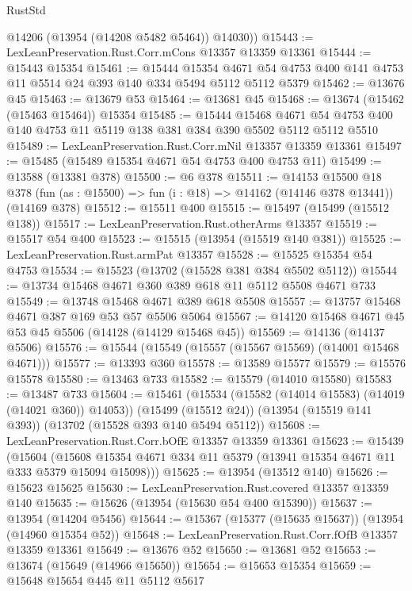 \begin{lexlean}{RustStd}
\begin{coremodule}
        @14206
        (@13954 (@14208 @5482 @5464))
        @14030))
@15443 := LexLeanPreservation.Rust.Corr.mCons @13357 @13359 @13361
@15444 := @15443 @15354
@15461 := @15444
    @15354
    @4671
    @54
    @4753
    @400
    @141
    @4753
    @11
    @5514
    @24
    @393
    @140
    @334
    @5494
    @5112
    @5112
    @5379
@15462 := @13676 @45
@15463 := @13679 @53
@15464 := @13681 @45
@15468 := @13674 (@15462 (@15463 @15464)) @15354
@15485 := @15444
    @15468
    @4671
    @54
    @4753
    @400
    @140
    @4753
    @11
    @5119
    @138
    @381
    @384
    @390
    @5502
    @5112
    @5112
    @5510
@15489 := LexLeanPreservation.Rust.Corr.mNil @13357 @13359 @13361
@15497 := @15485 (@15489 @15354 @4671 @54 @4753 @400 @4753 @11)
@15499 := @13588 (@13381 @378)
@15500 := @6 @378
@15511 := @14153
    @15500
    @18
    @378
    (fun (as : @15500) => fun (i : @18) => @14162 (@14146 @378 @13441))
    (@14169 @378)
@15512 := @15511 @400
@15515 := @15497 (@15499 (@15512 @138))
@15517 := LexLeanPreservation.Rust.otherArms @13357
@15519 := @15517 @54 @400
@15523 := @15515 (@13954 (@15519 @140 @381))
@15525 := LexLeanPreservation.Rust.armPat @13357
@15528 := @15525 @15354 @54 @4753
@15534 := @15523 (@13702 (@15528 @381 @384 @5502 @5112))
@15544 := @13734 @15468 @4671 @360 @389 @618 @11 @5112 @5508 @4671 @733
@15549 := @13748 @15468 @4671 @389 @618 @5508
@15557 := @13757 @15468 @4671 @387 @169 @53 @57 @5506 @5064
@15567 := @14120 @15468 @4671 @45 @53 @45 @5506 (@14128 (@14129 @15468 @45))
@15569 := @14136 (@14137 @5506)
@15576 := @15544 (@15549 (@15557 (@15567 @15569) (@14001 @15468 @4671)))
@15577 := @13393 @360
@15578 := @13589 @15577
@15579 := @15576 @15578
@15580 := @13463 @733
@15582 := @15579 (@14010 @15580)
@15583 := @13487 @733
@15604 := @15461
    (@15534 (@15582 (@14014 @15583) (@14019 (@14021 @360)) @14053))
    (@15499 (@15512 @24))
    (@13954 (@15519 @141 @393))
    (@13702 (@15528 @393 @140 @5494 @5112))
@15608 := LexLeanPreservation.Rust.Corr.bOfE @13357 @13359 @13361
@15623 := @15439
    (@15604 (@15608 @15354 @4671 @334 @11 @5379 (@13941 @15354 @4671 @11 @333 @5379 @15094 @15098)))
@15625 := @13954 (@13512 @140)
@15626 := @15623 @15625
@15630 := LexLeanPreservation.Rust.covered @13357 @13359 @140
@15635 := @15626 (@13954 (@15630 @54 @400 @15390))
@15637 := @13954 (@14204 @5456)
@15644 := @15367 (@15377 (@15635 @15637)) (@13954 (@14960 @15354 @52))
@15648 := LexLeanPreservation.Rust.Corr.fOfB @13357 @13359 @13361
@15649 := @13676 @52
@15650 := @13681 @52
@15653 := @13674 (@15649 (@14966 @15650))
@15654 := @15653 @15354
@15659 := @15648 @15654 @445 @11 @5112 @5617

\end{coremodule}
\end{lexlean}
